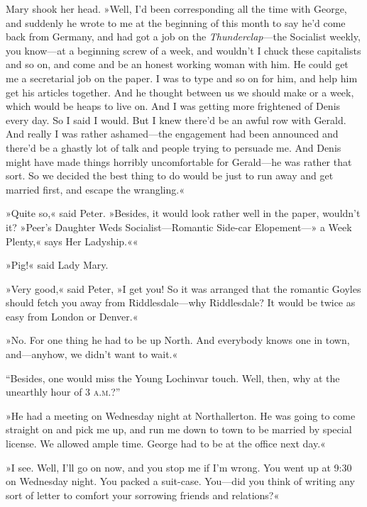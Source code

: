 Mary shook her head. »Well, I'd been corresponding all the time with George, and suddenly he wrote to me at the beginning of this month to say he'd come back from Germany, and had got a job on the \textit{Thunderclap}---the Socialist weekly, you know\allowbreak---\allowbreak at a beginning screw of  a week, and wouldn't I chuck these capitalists and so on, and come and be an honest working woman with him. He could get me a secretarial job on the paper. I was to type and so on for him, and help him get his articles together. And he thought between us we should make  or  a week, which would be heaps to live on. And I was getting more frightened of Denis every day. So I said I would. But I knew there'd be an awful row with Gerald. And really I was rather ashamed\allowbreak---\allowbreak the engagement had been announced and there'd be a ghastly lot of talk and people trying to persuade me. And Denis might have made things horribly uncomfortable for Gerald\allowbreak---\allowbreak he was rather that sort. So we decided the best thing to do would be just to run away and get married first, and escape the wrangling.«

»Quite so,« said Peter. »Besides, it would look rather well in the paper, wouldn't it? »Peer's Daughter Weds Socialist\allowbreak---\allowbreak Romantic Side-car Elopement---» a Week Plenty,« says Her Ladyship.««

»Pig!« said Lady Mary.

»Very good,« said Peter, »I get you! So it was arranged that the romantic Goyles should fetch you away from Riddlesdale\allowbreak---\allowbreak why Riddlesdale? It would be twice as easy from London or Denver.«

»No. For one thing he had to be up North. And everybody knows one in town, and\allowbreak---\allowbreak anyhow, we didn't want to wait.«

\enquote{Besides, one would miss the Young Lochinvar touch. Well, then, why at the unearthly hour of 3 \textsc{a.m.}?}

»He had a meeting on Wednesday night at Northallerton. He was going to come straight on and pick me up, and run me down to town to be married by special license. We allowed ample time. George had to be at the office next day.«

»I see. Well, I'll go on now, and you stop me if I'm wrong. You went up at 9:30 on Wednesday night. You packed a suit-case. You\allowbreak---\allowbreak did you think of writing any sort of letter to comfort your sorrowing friends and relations?«

